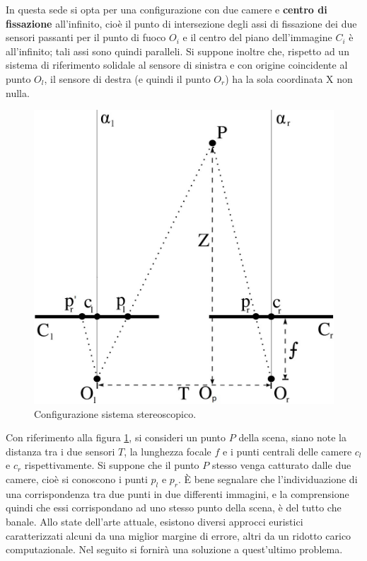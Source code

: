 In questa sede si opta per una configurazione con due camere e \textbf{centro di fissazione} all'infinito, cioè il punto di intersezione degli assi di fissazione dei due sensori passanti per il punto di fuoco $O_i$ e il centro del piano dell'immagine $C_i$ è all'infinito; tali assi sono quindi paralleli. Si suppone inoltre che, rispetto ad un sistema di riferimento solidale al sensore di sinistra e con origine coincidente al punto $O_l$, il sensore di destra (e quindi il punto $O_r$) ha la sola coordinata X non nulla.
\begin{figure}[h!]
	\centering
	\includegraphics[width=360pt]{imgs/stereo.jpg}
	\caption{Configurazione sistema stereoscopico.}
	\label{vis:stereo:sistem}
\end{figure} 

Con riferimento alla figura \ref{vis:stereo:sistem}, si consideri un punto $P$ della scena, siano note la distanza tra i due sensori $T$, la lunghezza focale $f$ e i punti centrali delle camere $c_l$ e $c_r$ rispettivamente. Si suppone che il punto $P$ stesso venga catturato dalle due camere, cioè si conoscono i punti $p_l$ e $p_r$. \`{E} bene segnalare che l'individuazione di una corrispondenza tra due punti in due differenti immagini, e la comprensione quindi che essi corrispondano ad uno stesso punto della scena, è del tutto che banale. Allo state dell'arte attuale, esistono diversi approcci euristici caratterizzati alcuni da una miglior margine di errore, altri da un ridotto carico computazionale. Nel seguito si fornirà una soluzione a quest'ultimo problema.

